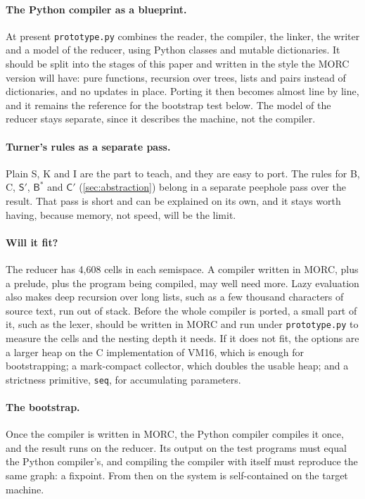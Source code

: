 \documentclass[11pt,a4paper]{article}
\newcommand{\cmb}[1]{\textsf{#1}}
\newcommand{\I}{\cmb{I}}
\newcommand{\K}{\cmb{K}}
\newcommand{\Sc}{\cmb{S}}
\newcommand{\B}{\cmb{B}}
\newcommand{\C}{\cmb{C}}
\newcommand{\Sp}{\cmb{S}'}
\newcommand{\Bs}{\cmb{B}^{*}}
\newcommand{\Cp}{\cmb{C}'}
\theoremstyle{definition}
\theoremstyle{plain}
\begin{document}
\paragraph{The Python compiler as a blueprint.} At present
\texttt{prototype.py} combines the reader, the compiler, the linker, the
writer and a model of the reducer, using Python classes and mutable
dictionaries. It should be split into the stages of this paper and written in
the style the MORC version will have: pure functions, recursion over trees,
lists and pairs instead of dictionaries, and no updates in place. Porting it
then becomes almost line by line, and it remains the reference for the
bootstrap test below. The model of the reducer stays separate, since it
describes the machine, not the compiler.

\paragraph{Turner's rules as a separate pass.} Plain \Sc, \K{} and \I{} are
the part to teach, and they are easy to port. The rules for \B, \C, $\Sp$,
$\Bs$ and $\Cp$ (\cref{sec:abstraction}) belong in a separate peephole pass
over the result. That pass is short and can be explained on its own, and it
stays worth having, because memory, not speed, will be the limit.

\paragraph{Will it fit?} The reducer has 4,608 cells in each semispace. A
compiler written in MORC, plus a prelude, plus the program being compiled,
may well need more. Lazy evaluation also makes deep recursion over long lists,
such as a few thousand characters of source text, run out of stack. Before
the whole compiler is ported, a small part of it, such as the lexer, should be
written in MORC and run under \texttt{prototype.py} to measure the cells and
the nesting depth it needs. If it does not fit, the options are a larger heap
on the C implementation of VM16, which is enough for bootstrapping; a
mark-compact collector, which doubles the usable heap; and a strictness
primitive, \texttt{seq}, for accumulating parameters.

\paragraph{The bootstrap.} Once the compiler is written in MORC, the Python
compiler compiles it once, and the result runs on the reducer. Its output on
the test programs must equal the Python compiler's, and compiling the
compiler with itself must reproduce the same graph: a fixpoint. From then on
the system is self-contained on the target machine.
\end{document}
